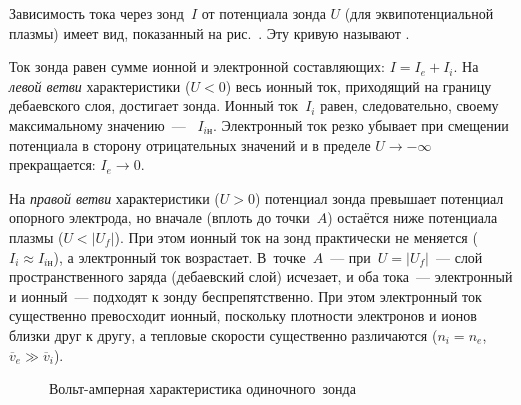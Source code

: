 Зависимость тока через зонд~$I$ 
от потенциала зонда $U$ (для эквипотенциальной плазмы) имеет вид, 
показанный на рис.~. 
Эту кривую называют .


Ток зонда равен сумме ионной и электронной составляющих:
$I=I_e + I_i$. 
На \emph{левой ветви} характеристики ($U<0$) весь ионный ток,
приходящий на границу дебаевского слоя, достигает зонда.
Ионный ток~$I_i$ равен, следовательно, своему максимальному значению~--- 
~$I_{iн}$.
Электронный ток резко убывает при смещении потенциала 
в сторону отрицательных значений и в пределе $U\to -\infty$ 
прекращается: $I_e\to 0$.

На \emph{правой ветви} характеристики ($U>0$) потенциал зонда превышает
потенциал опорного электрода, но вначале (вплоть до точки~$A$)
остаётся ниже потенциала плазмы ($U<|U_f|$). При этом ионный ток на зонд
практически не меняется ($I_i\approx I_{iн}$),
а электронный ток возрастает. В~точке~$A$~--- при~$U=|U_f|$~---
слой пространственного заряда (дебаевский слой) исчезает, и оба тока~---
электронный и ионный~--- подходят к зонду беспрепятственно.
При этом электронный ток существенно превосходит ионный,
поскольку плотности электронов и ионов близки друг к другу, 
а тепловые скорости существенно различаются
($n_i=n_e$, $\overline{v}_e\gg \overline{v}_i$).

\begin{figure}[h!]
    \centering
    \caption{Вольт-амперная характеристика одиночного~зонда}
\end{figure}





